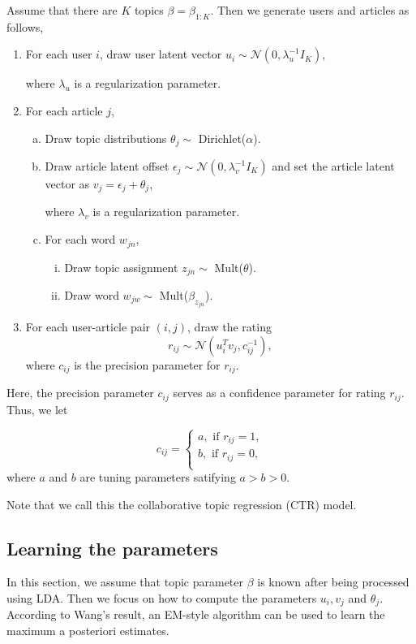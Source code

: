 \documentclass{acm_proc_article-sp}
\begin{document}
Assume that there are $K$ topics $\beta=\beta_{1:K}$. Then we generate users and articles as follows,

\begin{enumerate}
    \item For each user $i$, draw user latent vector $u_i \sim \mathcal{N}(0,\lambda_u^{-1}I_K)$,

    where $\lambda_u$ is a regularization parameter.
    \item For each article $j$,
       \begin{enumerate}[(a)]
           \item Draw topic distributions $\theta_j \sim$ Dirichlet($\alpha$).
           \item Draw article latent offset $\epsilon_j \sim \mathcal{N}(0, \lambda_v^{-1}I_K)$ and set the article latent vector as $v_j=\epsilon_j+\theta_j$,

           where $\lambda_v$ is a regularization parameter.
           \item For each word $w_{jn}$,
              \begin{enumerate}[i.]
                  \item Draw topic assignment $z_{jn}\sim$ Mult($\theta$).
                  \item Draw word $w_{jw}\sim$ Mult($\beta_{z_{jn}}$).
              \end{enumerate}
       \end{enumerate}
    \item For each user-article pair $(i,j)$, draw the rating
    $$r_{ij}\sim\mathcal{N}(u_i^Tv_j,c_{ij}^{-1}),$$
    where $c_{ij}$ is the precision parameter for $r_{ij}$.
\end{enumerate}

Here, the precision parameter $c_{ij}$ serves as a confidence parameter for rating $r_{ij}$. Thus, we let

\begin{equation*}
  c_{ij}=
  \left\{
   \begin{array}{l}
   a, \text{ if } r_{ij}=1,  \\
   b, \text{ if } r_{ij}=0, \\
   \end{array}
  \right.
\end{equation*}
where $a$ and $b$ are tuning parameters satifying $a>b>0$.

Note that we call this the collaborative topic regression (CTR) model.

\subsection{Learning the parameters}
\label{learning}
In this section, we assume that topic parameter $\beta$ is known after being processed using LDA. Then we focus on how to compute the parameters $u_i, v_j$ and $\theta_j$. According to Wang's result\cite{wang:2011:CTM:2020408.2020480}, an EM-style algorithm can be used to learn the maximum a posteriori estimates.
\end{document}
